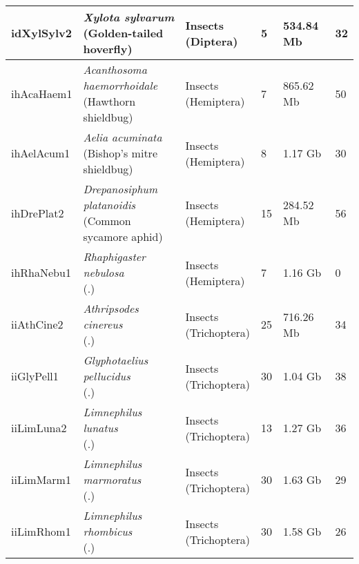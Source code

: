 \begin{centering}
\begin{longtable}{l|l|l|l|l|l}
idXylSylv2 & \makecell[{l}]{\textit{Xylota sylvarum} \\ (Golden-tailed hoverfly)} & \makecell[{l}]{Insects \\ (Diptera)} & 5 & 534.84 Mb & 32  \\ \hline
ihAcaHaem1 & \makecell[{l}]{\textit{Acanthosoma haemorrhoidale} \\ (Hawthorn shieldbug)} & \makecell[{l}]{Insects \\ (Hemiptera)} & 7 & 865.62 Mb & 50  \\ \hline
ihAelAcum1 & \makecell[{l}]{\textit{Aelia acuminata} \\ (Bishop's mitre shieldbug)} & \makecell[{l}]{Insects \\ (Hemiptera)} & 8 & 1.17 Gb & 30  \\ \hline
ihDrePlat2 & \makecell[{l}]{\textit{Drepanosiphum platanoidis} \\ (Common sycamore aphid)} & \makecell[{l}]{Insects \\ (Hemiptera)} & 15 & 284.52 Mb & 56  \\ \hline
ihRhaNebu1 & \makecell[{l}]{\textit{Rhaphigaster nebulosa} \\ (.)} & \makecell[{l}]{Insects \\ (Hemiptera)} & 7 & 1.16 Gb & 0  \\ \hline
iiAthCine2 & \makecell[{l}]{\textit{Athripsodes cinereus} \\ (.)} & \makecell[{l}]{Insects \\ (Trichoptera)} & 25 & 716.26 Mb & 34  \\ \hline
iiGlyPell1 & \makecell[{l}]{\textit{Glyphotaelius pellucidus} \\ (.)} & \makecell[{l}]{Insects \\ (Trichoptera)} & 30 & 1.04 Gb & 38  \\ \hline
iiLimLuna2 & \makecell[{l}]{\textit{Limnephilus lunatus} \\ (.)} & \makecell[{l}]{Insects \\ (Trichoptera)} & 13 & 1.27 Gb & 36  \\ \hline
iiLimMarm1 & \makecell[{l}]{\textit{Limnephilus marmoratus} \\ (.)} & \makecell[{l}]{Insects \\ (Trichoptera)} & 30 & 1.63 Gb & 29  \\ \hline
iiLimRhom1 & \makecell[{l}]{\textit{Limnephilus rhombicus} \\ (.)} & \makecell[{l}]{Insects \\ (Trichoptera)} & 30 & 1.58 Gb & 26  \\ \hline

\end{longtable}
\end{centering}
